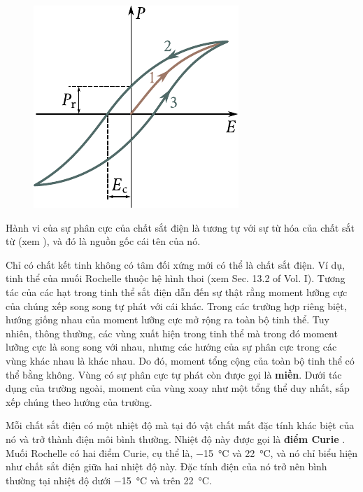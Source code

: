 \begin{figure}[!htb]
    \begin{center}
		\includegraphics[scale=1.0]{figures/ch_02/fig_2_13.pdf}
		\caption[]{}
		\label{fig:2_13}
	\end{center}
    \vspace{-0.8cm}
\end{figure}

Hành vi của sự phân cực của chất sắt điện là tương tự với sự từ hóa của chất sắt từ (xem ), và đó là nguồn gốc cái tên của nó.

Chỉ có chất kết tinh không có tâm đối xứng mới có thể là chất sắt điện. Ví dụ, tinh thể của muối Rochelle thuộc hệ hình thoi (xem Sec. 13.2 of Vol. I). Tương tác của các hạt trong tinh thể sắt điện dẫn đến sự thật rằng moment lưỡng cực của chúng xếp song song tự phát với cái khác. Trong các trường hợp riêng biệt, hướng giống nhau của moment lưỡng cực mở rộng ra toàn bộ tinh thể. Tuy nhiên, thông thường, các vùng xuất hiện trong tinh thể mà trong đó moment lưỡng cực là song song với nhau, nhưng các hướng của sự phân cực trong các vùng khác nhau là khác nhau. Do đó, moment tổng cộng của toàn bộ tinh thể có thể bằng không. Vùng có sự phân cực tự phát còn được gọi là \textbf{miền}. Dưới tác dụng của trường ngoài, moment của vùng xoay như một tổng thể duy nhất, sắp xếp chúng theo hướng của trường.

Mỗi chất sắt điện có một nhiệt độ mà tại đó vật chất mất đặc tính khác biệt của nó và trở thành điện môi bình thường. Nhiệt độ này được gọi là \textbf{điểm Curie }. Muối Rochelle có hai điểm Curie, cụ thể là, \SI{-15}{\degreeCelsius} và \SI{+22}{\degreeCelsius}, và nó chỉ biểu hiện như chất sắt điện giữa hai nhiệt độ này. Đặc tính điện của nó trở nên bình thường tại nhiệt độ dưới \SI{-15}{\degreeCelsius} và trên \SI{+22}{\degreeCelsius}.
